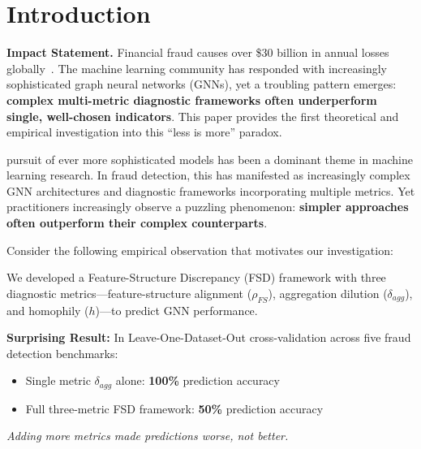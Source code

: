 \section{Introduction}
\label{sec:intro}


\textbf{Impact Statement.} Financial fraud causes over \$30 billion in annual losses globally~\cite{acfe2022fraud}. The machine learning community has responded with increasingly sophisticated graph neural networks (GNNs), yet a troubling pattern emerges: \textbf{complex multi-metric diagnostic frameworks often underperform single, well-chosen indicators}. This paper provides the first theoretical and empirical investigation into this ``less is more'' paradox.

 pursuit of ever more sophisticated models has been a dominant theme in machine learning research. In fraud detection, this has manifested as increasingly complex GNN architectures and diagnostic frameworks incorporating multiple metrics. Yet practitioners increasingly observe a puzzling phenomenon: \textbf{simpler approaches often outperform their complex counterparts}.

Consider the following empirical observation that motivates our investigation:

\begin{tcolorbox}[colback=gray!5, colframe=gray!50, title=\textbf{The Counterintuitive Discovery}]
We developed a Feature-Structure Discrepancy (FSD) framework with three diagnostic metrics---feature-structure alignment ($\rho_{FS}$), aggregation dilution ($\delta_{agg}$), and homophily ($h$)---to predict GNN performance.

\textbf{Surprising Result:} In Leave-One-Dataset-Out cross-validation across five fraud detection benchmarks:
\begin{itemize}
    \item Single metric $\delta_{agg}$ alone: \textbf{100\%} prediction accuracy
    \item Full three-metric FSD framework: \textbf{50\%} prediction accuracy
\end{itemize}

\textit{Adding more metrics made predictions worse, not better.}
\end{tcolorbox}


